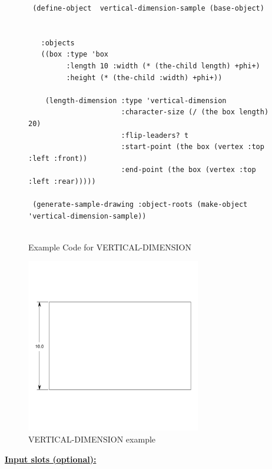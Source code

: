 \documentclass [11pt]{book}
\begin{document}
\begin{itemize}
\begin{figure}
\begin{lrbox}{\boxedverb}
\begin{minipage}{\linewidth}
{\begin{verbatim}
 (define-object  vertical-dimension-sample (base-object)
  
  
   :objects
   ((box :type 'box
         :length 10 :width (* (the-child length) +phi+)
         :height (* (the-child :width) +phi+))
   
    (length-dimension :type 'vertical-dimension
                      :character-size (/ (the box length) 20)
                      :flip-leaders? t
                      :start-point (the box (vertex :top :left :front))
                      :end-point (the box (vertex :top :left :rear)))))

 (generate-sample-drawing :object-roots (make-object 'vertical-dimension-sample))


\end{verbatim}}
\end{minipage}
\end{lrbox}
\fbox{\usebox{\boxedverb}}

\caption{Example Code for VERTICAL-DIMENSION}

\label{fig:example-code-VERTICAL-DIMENSION}

\end{figure}

\begin{figure}
\begin{center}
\includegraphics[width=3in,height=3in]{../images/example-VERTICAL-DIMENSION.pdf}
\end{center}

\caption{VERTICAL-DIMENSION example}

\label{fig:VERTICAL-DIMENSION}

\end{figure}





\textbf{
\underline{Input slots (optional):}}


\end{itemize}
\end{document}
